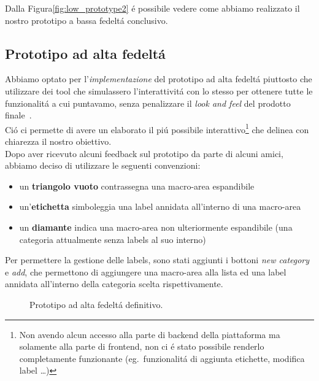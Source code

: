 \documentclass[12pt]{article} %
\begin{document}
Dalla Figura\ref{fig:low_prototype2} \'e possibile vedere come abbiamo realizzato il nostro prototipo a bassa fedelt\'a conclusivo.\\

\subsection{Prototipo ad alta fedelt\'a}
Abbiamo optato per l'\emph{implementazione} del prototipo ad alta fedelt\'a piuttosto che utilizzare dei tool che simulassero l'interattivit\'a con lo stesso per ottenere tutte le funzionalit\'a a cui puntavamo, senza penalizzare il \emph{look and feel} del prodotto finale~\cite[p.~263]{InteractionDesign}.\\
Ci\'o ci permette di avere un elaborato il pi\'u possibile interattivo\footnote{Non avendo alcun accesso alla parte di backend della piattaforma ma solamente alla parte di frontend, non ci \'e stato possibile renderlo completamente funzionante (eg.\ funzionalit\'a di aggiunta etichette, modifica label \dots)} che delinea con chiarezza il nostro obiettivo.\\
Dopo aver ricevuto alcuni feedback sul prototipo da parte di alcuni amici, abbiamo deciso di utilizzare le seguenti convenzioni:
\begin{itemize}
\item un \textbf{triangolo vuoto} contrassegna una macro-area espandibile
\item un'\textbf{etichetta} simboleggia una label annidata all'interno di una macro-area
\item un \textbf{diamante} indica una macro-area non ulteriormente espandibile (una categoria attualmente senza labels al suo interno)
\end{itemize}
Per permettere la gestione delle labels, sono stati aggiunti i bottoni \emph{new category} e \emph{add}, che permettono di aggiungere una macro-area alla lista ed una label annidata all'interno della categoria scelta rispettivamente.

\begin{figure}[H]
\caption{Prototipo ad alta fedelt\'a definitivo.}
\label{fig:dopo}
\end{figure}
\end{document}
